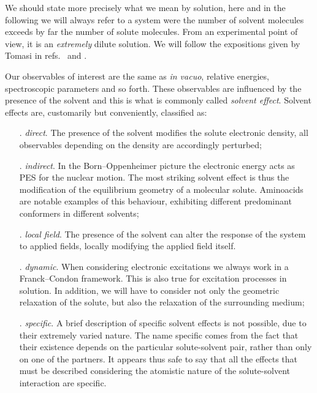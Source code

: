 
We should state more precisely what we mean by solution, here and in the
following we will always refer to a system were the number of solvent
molecules exceeds by far the number of solute molecules. From an
experimental point of view, it is an \emph{extremely} dilute solution.
We will follow the expositions given by Tomasi in refs.~
 and .

Our observables of interest are the same as \emph{in vacuo}, \ie
relative energies, spectroscopic parameters and so forth. These
observables are influenced by the presence of the solvent and this is
what is commonly called \emph{solvent effect}.
Solvent effects are, customarily but conveniently, classified as:
\begin{itemize}
\item[.] \emph{direct}. The presence of the solvent modifies the solute
  electronic density, all observables depending on the density are
  accordingly perturbed;
\item[.] \emph{indirect}. In the Born--Oppenheimer picture the
  electronic energy acts as \ac{PES} for the
  nuclear motion. The most striking solvent effect is thus the
  modification of the equilibrium geometry of a molecular solute.
  Aminoacids are notable examples of this behaviour, exhibiting
  different predominant conformers in different solvents;
\item[.] \emph{local field}. The presence of the solvent can alter the
  response of the system to applied fields, locally modifying the
  applied field itself.~\autocite{Cammi1998-jp, Pipolo2014-sd}
\item[.] \emph{dynamic}. When considering electronic excitations we
  always work in a Franck--Condon framework. This is also true for
  excitation processes in solution. In addition, we will have to
  consider not only the geometric relaxation of the solute, but also the
  relaxation of the surrounding medium;
\item[.] \emph{specific}. A brief description of specific solvent
  effects is not possible, due to their extremely varied nature. The
  name specific comes from the fact that their existence depends on the
  particular solute-solvent pair, rather than only on one of the
  partners. It appears thus safe to say that all the effects that must
  be described considering the atomistic nature of the solute-solvent
  interaction are specific.
\end{itemize}

